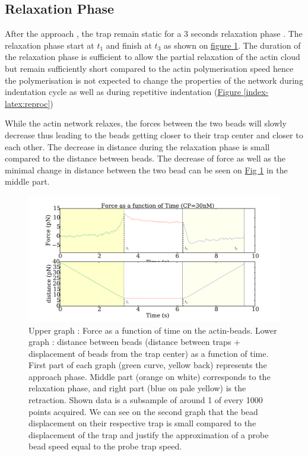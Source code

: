 \documentclass[A4paperpaper,11pt,english]{sphinxmanual}
\begin{document}
\subsection{Relaxation Phase}
\label{index-latex:relaxation-phase}
After the approach , the trap remain static for a 3 seconds relaxation phase
. The relaxation phase start at \(t_1\) and
finish at \(t_3\) as shown on \hyperref[index-latex:figindent-time]{figure  \ref*{index-latex:figindent-time}}. The duration of the relaxation phase is sufficient to allow the partial
relaxation of the actin cloud  but remain sufficiently short compared to
the actin polymerisation speed hence the polymerisation is not expected to
change the properties of the network during indentation cycle as well as
during repetitive indentation (\hyperref[index-latex:reproc]{Figure  \ref*{index-latex:reproc}})

While the actin network relaxes, the forces between the two beads will slowly
decrease thus leading to the beads getting closer to their trap center and
closer to each other. The decrease in distance during the relaxation phase is
small compared to the distance between beads. The decrease of force as well as
the minimal change in distance between the two bead can be seen on \hyperref[index-latex:figindent-time]{Fig  \ref*{index-latex:figindent-time}}
in the middle part.
\begin{figure}[htbp]
\centering
\capstart

\includegraphics[width=0.700\linewidth]{force_time.pdf}
\caption{Upper graph : Force as a function of time on the actin-beads.  Lower graph
: distance between beads (distance between traps + displacement of beads
from the trap center) as a function of time. First part of each graph
(green curve, yellow back) represents the approach phase. Middle part
(orange on white) corresponds to the relaxation phase, and right part (blue on pale
yellow) is the retraction.  Shown data is a subsample of around 1 of every
1000 points acquired. We can see on the second graph that the bead
displacement on their respective trap is small compared to the
displacement of the trap and justify the approximation of a probe bead
speed equal to the probe trap speed.}\label{index-latex:figindent-time}\end{figure}
\end{document}

